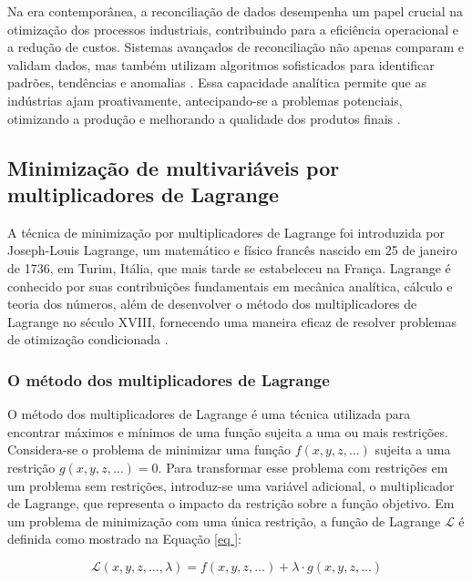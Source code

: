 Na era contemporânea, a reconciliação de dados desempenha um papel crucial na otimização dos processos industriais, contribuindo para a eficiência operacional e a redução de custos. Sistemas avançados de reconciliação não apenas comparam e validam dados, mas também utilizam algoritmos sofisticados para identificar padrões, tendências e anomalias \cite{datarecragnoli}. Essa capacidade analítica permite que as indústrias ajam proativamente, antecipando-se a problemas potenciais, otimizando a produção e melhorando a qualidade dos produtos finais \cite{datarecshakar}.

\subsection{Minimização de multivariáveis por multiplicadores de Lagrange}

A técnica de minimização por multiplicadores de Lagrange foi introduzida por Joseph-Louis Lagrange, um matemático e físico francês nascido em 25 de janeiro de 1736, em Turim, Itália, que mais tarde se estabeleceu na França. Lagrange é conhecido por suas contribuições fundamentais em mecânica analítica, cálculo e teoria dos números, além de desenvolver o método dos multiplicadores de Lagrange no século XVIII, fornecendo uma maneira eficaz de resolver problemas de otimização condicionada \cite{lagrange}.

\subsubsection{O método dos multiplicadores de Lagrange}

O método dos multiplicadores de Lagrange é uma técnica utilizada para encontrar máximos e mínimos de uma função sujeita a uma ou mais restrições. Considera-se o problema de minimizar uma função $f(x, y, z, \dots)$ sujeita a uma restrição $g(x, y, z, \dots) = 0$. Para transformar esse problema com restrições em um problema sem restrições, introduz-se uma variável adicional, o multiplicador de Lagrange, que representa o impacto da restrição sobre a função objetivo. Em um problema de minimização com uma única restrição, a função de Lagrange $\mathcal{L}$ é definida como mostrado na Equação \ref{eq
}:

\begin{equation} \mathcal{L}(x, y, z, \dots, \lambda) = f(x, y, z, \dots) + \lambda \cdot g(x, y, z, \dots) \label{eq
} \end{equation}

